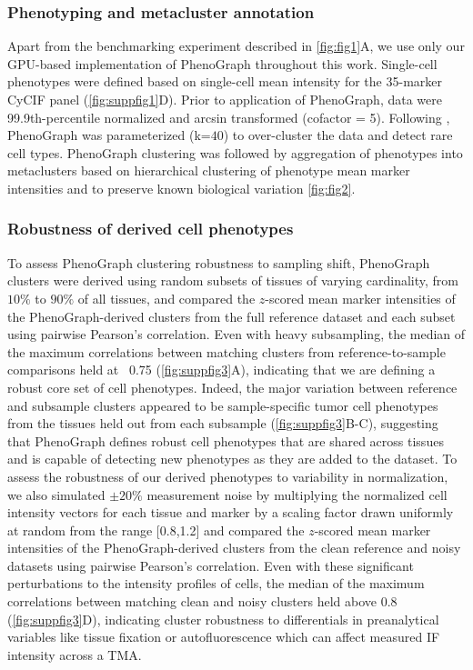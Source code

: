 \documentclass[preprint,review,3p,12pt]{elsarticle}
\begin{document}
\subsubsection{Phenotyping and metacluster annotation}
Apart from the benchmarking experiment described in \autoref{fig:fig1}A, we use only our GPU-based implementation of PhenoGraph throughout this work. Single-cell phenotypes were defined based on single-cell mean intensity for the 35-marker CyCIF panel (\autoref{fig:suppfig1}D). Prior to application of PhenoGraph, data were 99.9th-percentile normalized and arcsin transformed (cofactor = 5). Following \cite{jackson_single-cell_2020}, PhenoGraph was parameterized (k=$40$) to over-cluster the data and detect rare cell types. PhenoGraph clustering was followed by aggregation of phenotypes into metaclusters based on hierarchical clustering of phenotype mean marker intensities and to preserve known biological variation \autoref{fig:fig2}. \\

\subsubsection{Robustness of derived cell phenotypes}
To assess PhenoGraph clustering robustness to sampling shift, PhenoGraph clusters were derived using random subsets of tissues of varying cardinality, from $10\%$ to $90\%$ of all tissues, and compared the $z$-scored mean marker intensities of the PhenoGraph-derived clusters from the full reference dataset and each subset using pairwise Pearson's correlation. Even with heavy subsampling, the median of the maximum correlations between matching clusters from reference-to-sample comparisons held at ~0.75 (\autoref{fig:suppfig3}A), indicating that we are defining a robust core set of cell phenotypes. Indeed, the major variation between reference and subsample clusters appeared to be sample-specific tumor cell phenotypes from the tissues held out from each subsample (\autoref{fig:suppfig3}B-C), suggesting that PhenoGraph defines robust cell phenotypes that are shared across tissues and is capable of detecting new phenotypes as they are added to the dataset. To assess the robustness of our derived phenotypes to variability in normalization, we also simulated $\pm20\%$ measurement noise by multiplying the normalized cell intensity vectors for each tissue and marker by a scaling factor drawn uniformly at random from the range [0.8,1.2] and compared the $z$-scored mean marker intensities of the PhenoGraph-derived clusters from the clean reference and noisy datasets using pairwise Pearson's correlation. Even with these significant perturbations to the intensity profiles of cells, the median of the maximum correlations between matching clean and noisy clusters held above 0.8 (\autoref{fig:suppfig3}D), indicating cluster robustness to differentials in preanalytical variables like tissue fixation or autofluorescence which can affect measured IF intensity across a TMA.
\end{document}
